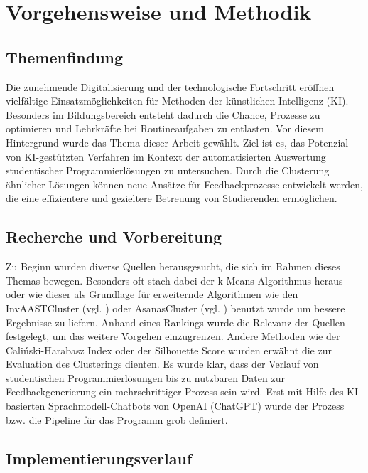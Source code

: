 \chapter{Vorgehensweise und Methodik}

\section{Themenfindung}
Die zunehmende Digitalisierung und der technologische Fortschritt eröffnen vielfältige Einsatzmöglichkeiten für Methoden der künstlichen Intelligenz (KI). Besonders im Bildungsbereich entsteht dadurch die Chance, Prozesse zu optimieren und Lehrkräfte bei Routineaufgaben zu entlasten. Vor diesem Hintergrund wurde das Thema dieser Arbeit gewählt. Ziel ist es, das Potenzial von KI-gestützten Verfahren im Kontext der automatisierten Auswertung studentischer Programmierlösungen zu untersuchen. Durch die Clusterung ähnlicher Lösungen können neue Ansätze für Feedbackprozesse entwickelt werden, die eine effizientere und gezieltere Betreuung von Studierenden ermöglichen.

\section{Recherche und Vorbereitung}
Zu Beginn wurden diverse Quellen herausgesucht, die sich im Rahmen dieses Themas bewegen. Besonders oft stach dabei der k-Means Algorithmus heraus oder wie dieser als Grundlage für erweiternde Algorithmen wie den InvAASTCluster (vgl. \cite{Orvalho.28.06.2022}) oder AsanasCluster (vgl. \cite{Paiva.2024}) benutzt wurde um bessere Ergebnisse zu liefern. Anhand eines Rankings wurde die Relevanz der Quellen festgelegt, um das weitere Vorgehen einzugrenzen. Andere Methoden wie der Caliński-Harabasz Index oder der Silhouette Score wurden erwähnt die zur Evaluation des Clusterings dienten. Es wurde klar, dass der Verlauf von studentischen Programmierlösungen bis zu nutzbaren Daten zur Feedbackgenerierung ein mehrschrittiger Prozess sein wird. Erst mit Hilfe des KI-basierten Sprachmodell-Chatbots von OpenAI (ChatGPT) wurde der Prozess bzw. die Pipeline für das Programm grob definiert. 

\section{Implementierungsverlauf}
